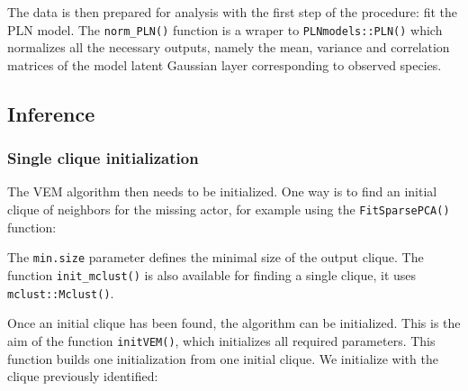 The data is then prepared for analysis with the first step of the
procedure: fit the PLN model. The \texttt{norm\_PLN()} function is a
wraper to \texttt{PLNmodels::PLN()} which normalizes all the necessary
outputs, namely the mean, variance and correlation matrices of the model
latent Gaussian layer corresponding to observed species.

\begin{Shaded}
\begin{Highlighting}[]
\OperatorTok{\$}
\OperatorTok{\$}
\OperatorTok{\$}
\OperatorTok{\$}
\end{Highlighting}
\end{Shaded}

\tocless\subsection{Inference}\label{inference}

\subsubsection{Single clique
initialization}\label{single-clique-initialization}

The VEM algorithm then needs to be initialized. One way is to find an
initial clique of neighbors for the missing actor, for example using the
\texttt{FitSparsePCA()} function:

\begin{Shaded}
\begin{Highlighting}[]
\StringTok{ }\OperatorTok{\$}\NormalTok{, } \NormalTok{)}\OperatorTok{\$}
\CommentTok{#> [[1]]}
\end{Highlighting}
\end{Shaded}

The \texttt{min.size} parameter defines the minimal size of the output
clique. The function \texttt{init\_mclust()} is also available for
finding a single clique, it uses \texttt{mclust::Mclust()}.

Once an initial clique has been found, the algorithm can be initialized.
This is the aim of the function \texttt{initVEM()}, which initializes
all required parameters. This function builds one initialization from
one initial clique. We initialize with the clique previously identified:

